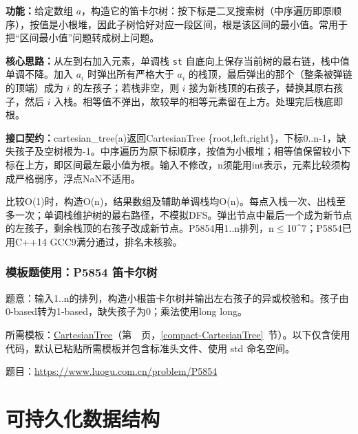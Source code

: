 \noindent\textbf{功能：}\allowbreak 给定数组 $a$，构造它的笛卡尔树：按下标是二叉搜索树（中序遍历即原顺序），按值是小根堆，因此子树恰好对应一段区间，根是该区间的最小值。常用于把“区间最小值”问题转成树上问题。

\textbf{核心思路：}\allowbreak 从左到右加入元素，单调栈 \texttt{st} 自底向上保存当前树的最右链，栈中值单调不降。加入 $a_i$ 时弹出所有严格大于 $a_i$ 的栈顶，最后弹出的那个（整条被弹链的顶端）成为 $i$ 的左孩子；若栈非空，则 $i$ 接为新栈顶的右孩子，替换其原右孩子，然后 $i$ 入栈。相等值不弹出，故较早的相等元素留在上方。处理完后栈底即根。



{\sloppy{}\noindent\textbf{接口契约：}cartesian\_tree(a)返回CartesianTree \{root,left,right\}，下标0..n-1，缺失孩子及空树根为-1。中序遍历为原下标顺序，按值为小根堆；相等值保留较小下标在上方，即区间最左最小值为根。输入不修改，n须能用int表示，元素比较须构成严格弱序，浮点NaN不适用。

比较O(1)时，构造O(n)，结果数组及辅助单调栈均O(n)。每点入栈一次、出栈至多一次；单调栈维护树的最右路径，不模拟DFS。弹出节点中最后一个成为新节点的左孩子，剩余栈顶的右孩子改成新节点。P5854用1..n排列，n$\le$10\textasciicircum{}7；P5854已用C++14 GCC9满分通过，排名未核验。\par}



\Needspace{362pt}

\subsection*{模板题使用：P5854 笛卡尔树}

\label{usage-example-392}

题意：输入1..n的排列，构造小根笛卡尔树并输出左右孩子的异或校验和。孩子由0-based转为1-based，缺失孩子为0；乘法使用long long。

所需模板：\hyperref[compact-CartesianTree]{CartesianTree}（第~\pageref{compact-CartesianTree}~页，\ref{compact-CartesianTree}~节）。以下仅含使用代码，默认已粘贴所需模板并包含标准头文件、使用 std 命名空间。

题目：\url{https://www.luogu.com.cn/problem/P5854}



\Needspace{180pt}

\chapter{可持久化数据结构}

